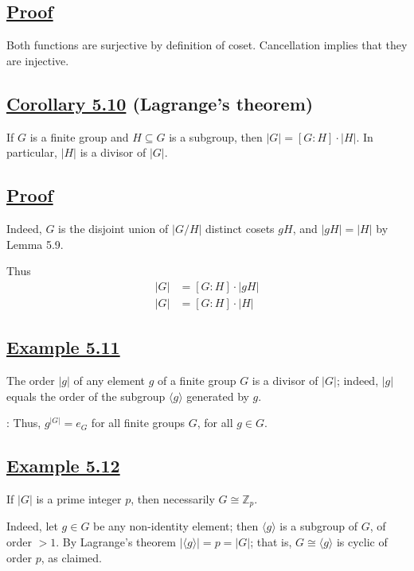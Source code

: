 \subsection*{\underline{Proof}}
Both functions are surjective by definition of coset. Cancellation implies that they are injective.

\vspace{1.5em}

\subsection*{\underline{Corollary 5.10} (Lagrange's theorem)}
If $G$ is a finite group and $H \subseteq G$ is a subgroup, then $|G| = [G:H] \cdot |H|$. In particular, $|H|$ is a divisor of $|G|$.

\vspace{1.5em}

\subsection*{\underline{Proof}}
Indeed, $G$ is the disjoint union of $|G/H|$ distinct cosets $gH$, and $|gH| = |H|$ by Lemma 5.9.

Thus
\begin{align*}
|G| &= [G:H] \cdot |gH| \\
|G| &= [G:H] \cdot |H|
\end{align*}

\vspace{1.5em}

\subsection*{\underline{Example 5.11}}
The order $|g|$ of any element $g$ of a finite group $G$ is a divisor of $|G|$; indeed, $|g|$ equals the order of the subgroup $\langle g \rangle$ generated by $g$.

\vspace{2em}

\noindent {}: Thus, $g^{|G|} = e_G$ for all finite groups $G$, for all $g \in G$.

\subsection*{\underline{Example 5.12}}
If $|G|$ is a prime integer $p$, then necessarily $G \cong \mathbb{Z}_p$.

Indeed, let $g \in G$ be any non-identity element; then $\langle g \rangle$ is a subgroup of $G$, of order $>1$. By Lagrange's theorem $|\langle g \rangle| = p = |G|$; that is, $G \cong \langle g \rangle$ is cyclic of order $p$, as claimed.

